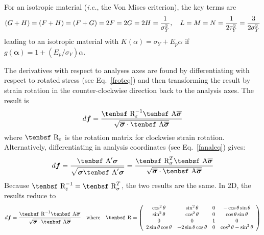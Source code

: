 \documentclass[11pt]{book}
\renewcommand{\vec}[1]{\boldsymbol{#1}}
\def\A{\hbox{\tenbsf A}}
\def\df{d \vec{f}}
\def\R{\hbox{\tenbsf R}}
\begin{document}
For an isotropic material ({\em i.e.}, the Von Mises criterion), the key terms are
\begin{equation}
   (G+H) = (F+H) = (F+G) = 2F = 2G = 2H = {1\over \sigma_Y^2}, \quad L=M=N = {1\over 2\tau_Y^2} = {3\over 2\sigma_Y^2}
\end{equation}
leading to an isotropic material with $K(\alpha)=\sigma_Y + E_p\alpha$ if $g(\vec\alpha) = 1 + (E_p/\sigma_Y)\alpha$.

The derivatives with respect to analyses axes are found by differentiating with respect to rotated stress (see Eq.~\ref{froteq}) and then transforming the result by strain rotation in the counter-clockwise direction back to the analysis axes. The result is
\begin{equation}
         \df = {\R_\varepsilon^{-1}\A \overline{\vec\sigma}\over\sqrt{\overline{\vec\sigma} \cdot \A \overline{\vec\sigma}}} \end{equation}
where $\R_\varepsilon$ is the rotation matrix for clockwise strain rotation. Alternatively, differentiating in analysis coordinates (see Eq.~\ref{fanaleq}) gives:
\begin{equation}
   \df = {\A' \vec\sigma\over\sqrt{\vec\sigma \A' \vec\sigma}}  = {\R_\sigma^T\A \overline{\vec\sigma}\over\sqrt{\overline{\vec\sigma} \cdot \A \overline{\vec\sigma}}} 
\end{equation}
Because $\R_\varepsilon^{-1} = \R_\sigma^T$, the two results are the same. In 2D, the results reduce to
\begin{equation}
         \df = {\R^{-1}\A \overline{\vec\sigma}\over\sqrt{\overline{\vec\sigma} \cdot \A \overline{\vec\sigma}}}    \quad{\rm where}\quad
         \R = \left( \begin{array}{cccc}
                       \cos^2\theta & \sin^2\theta & 0 & -\cos\theta\sin\theta \\
                       \sin^2\theta & \cos^2\theta & 0 & \cos\theta\sin\theta \\
                       0 & 0 & 1 & 0 \\
                       2\sin\theta\cos\theta & -2\sin\theta\cos\theta & 0 & \cos^2\theta - \sin^2\theta
                       \end{array} \right)
\end{equation}
\end{document}
